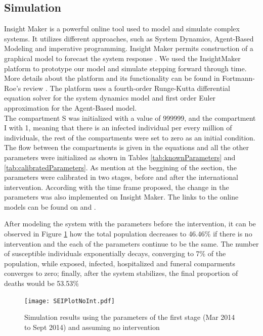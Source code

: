 \subsection{Simulation}
 Insight Maker is a powerful online tool used to model and simulate complex systems. It utilizes different approaches, such as System Dynamics, Agent-Based Modeling and imperative programming. Insight Maker permits  construction of a graphical model to forecast the system response \cite{FortmannRoe}. We used the InsightMaker platform to prototype our model and simulate stepping forward through time. More details about the platform and its functionality can be found in Fortmann-Roe's review \cite{FortmannRoe}. The platform uses a fourth-order Runge-Kutta differential equation solver for the system dynamics model and  first order Euler approximation for the Agent-Based model.\\

\noindent The compartment S was initialized with a value of 999999, and the compartment I with 1, meaning that there is an infected individual per every million of individuals, the rest of the compartments were set to zero as an initial condition. The flow between the compartments is given in the equations and all the other parameters were initialized as shown in Tables   \ref{tab:knownParameters} and \ref{tab:calibratedParameters}.  As mention at the beggining of the section, the parameters were calibrated in two stages, before and after the international intervention. According with the time frame proposed, the change in the parameters was also implemented on Insight Maker. The links to the online models can be found on \cite{IM_AI} and  \cite{IM_BI}.  


%
\noindent After modeling the system with the parameters before the intervention, it can be observed in Figure \ref{fig:LB_IM_NoIn} how the total population decreases to 46.46\%  if there is no intervention and the each of the parameters continue to be the same. The number of susceptible individuals exponentially decays, converging to 7\% of the population, while exposed, infected, hospitalized and funeral comparments converges to zero; finally, after the system stabilizes, the final proportion of deaths would be 53.53\% 

\begin{figure}[!h]
  \centering
  \texttt{[image: SEIPlotNoInt.pdf]}
  \caption{Simulation results using the parameters of the first stage (Mar 2014  to Sept 2014) and assuming no intervention}
\label{fig:LB_IM_NoIn} 
\end{figure}

